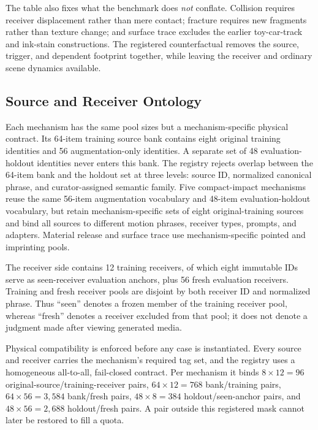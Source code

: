 The table also fixes what the benchmark does \emph{not} conflate.  Collision
requires receiver displacement rather than mere contact; fracture requires
new fragments rather than texture change; and surface trace excludes the
earlier toy-car-track and ink-stain constructions.  The registered
counterfactual removes the source, trigger, and dependent footprint together,
while leaving the receiver and ordinary scene dynamics available.

\subsection{Source and Receiver Ontology}
\label{app:source-receiver-ontology}

Each mechanism has the same pool sizes but a mechanism-specific physical
contract.  Its 64-item training source bank contains eight original training
identities and 56 augmentation-only identities.  A separate set of 48
evaluation-holdout identities never enters this bank.  The registry rejects
overlap between the 64-item bank and the holdout set at three levels: source
ID, normalized canonical phrase, and curator-assigned semantic family. Five
compact-impact mechanisms reuse the same 56-item augmentation vocabulary and
48-item evaluation-holdout vocabulary, but retain mechanism-specific sets of
eight original-training sources and bind all sources to different motion
phrases, receiver types, prompts, and adapters. Material release and surface
trace use mechanism-specific pointed and imprinting pools.

The receiver side contains 12 training receivers, of which eight immutable
IDs serve as seen-receiver evaluation anchors, plus 56 fresh evaluation
receivers.  Training and fresh receiver pools are disjoint by both receiver ID
and normalized phrase.  Thus ``seen'' denotes a frozen member of the training
receiver pool, whereas ``fresh'' denotes a receiver excluded from that pool;
it does not denote a judgment made after viewing generated media.

Physical compatibility is enforced before any case is instantiated.  Every
source and receiver carries the mechanism's required tag set, and the registry
uses a homogeneous all-to-all, fail-closed contract.  Per mechanism it binds
\(8\times12=96\) original-source/training-receiver pairs,
\(64\times12=768\) bank/training pairs,
\(64\times56=3{,}584\) bank/fresh pairs,
\(48\times8=384\) holdout/seen-anchor pairs, and
\(48\times56=2{,}688\) holdout/fresh pairs.  A pair outside this registered mask
cannot later be restored to fill a quota.

